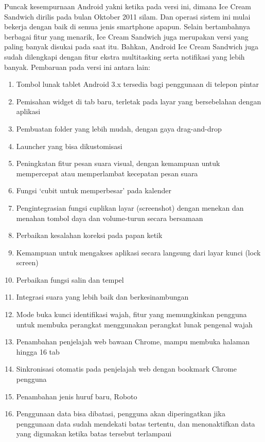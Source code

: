 \begin{enumerate}
Puncak kesempurnaan Android yakni ketika pada versi ini, dimana Ice Cream Sandwich dirilis pada bulan Oktober 2011 silam. Dan operasi sistem ini mulai bekerja dengan baik di semua jenis smartphone apapun. Selain bertambahnya berbagai fitur yang menarik, Ice Cream Sandwich juga merupakan versi yang paling banyak disukai pada saat itu. Bahkan, Android Ice Cream Sandwich juga sudah dilengkapi dengan fitur ekstra multitasking serta notifikasi yang lebih banyak. Pembaruan pada versi ini antara lain:
\begin{enumerate}
    \item Tombol lunak tablet Android 3.x tersedia bagi penggunaan di telepon pintar
    \item Pemisahan widget di tab baru, terletak pada layar yang bersebelahan dengan aplikasi
    \item Pembuatan folder yang lebih mudah, dengan gaya drag-and-drop
    \item Launcher yang bisa dikustomisasi
    \item Peningkatan fitur pesan suara visual, dengan kemampuan untuk mempercepat atau memperlambat kecepatan pesan suara
    \item Fungsi ‘cubit untuk memperbesar’ pada kalender
    \item Pengintegrasian fungsi cuplikan layar (screenshot) dengan menekan dan menahan tombol daya dan volume-turun secara bersamaan
    \item Perbaikan kesalahan koreksi pada papan ketik
    \item Kemampuan untuk mengakses aplikasi secara langsung dari layar kunci (lock screen)
    \item Perbaikan fungsi salin dan tempel
    \item Integrasi suara yang lebih baik dan berkesinambungan
    \item Mode buka kunci identifikasi wajah, fitur yang memungkinkan pengguna untuk membuka perangkat menggunakan perangkat lunak pengenal wajah
    \item Penambahan penjelajah web bawaan Chrome, mampu membuka halaman hingga 16 tab
    \item Sinkronisasi otomatis pada penjelajah web dengan bookmark Chrome pengguna
    \item Penambahan jenis huruf baru, Roboto
    \item Penggunaan data bisa dibatasi, pengguna akan diperingatkan jika penggunaan data sudah mendekati batas tertentu, dan menonaktifkan data yang digunakan ketika batas tersebut terlampaui

\end{enumerate}
\end{enumerate}
